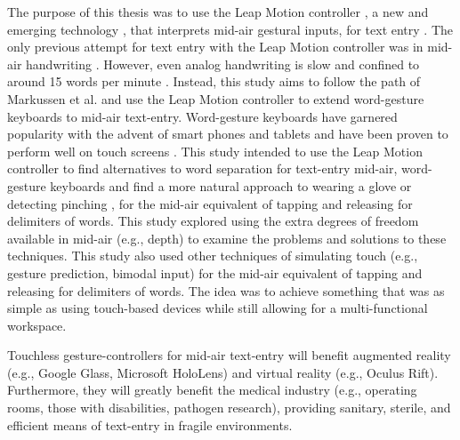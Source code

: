 The purpose of this thesis was to use the Leap Motion controller \cite{ref_leap_motion}, a new and emerging technology \cite{ref_leap_painting,ref_leap_device_evaluation_1,ref_leap_device_evaluation_2}, that interprets mid-air gestural inputs, for text entry \cite{ref_leap_tech}. The only previous attempt for text entry with the Leap Motion controller was in mid-air handwriting \cite{ref_air_handwriting}. However, even analog handwriting is slow and confined to around 15 words per minute \cite{ref_handprinting_alternatives}. Instead, this study aims to follow the path of Markussen et al. \cite{ref_vulture} and use the Leap Motion controller to extend word-gesture keyboards to mid-air text-entry. Word-gesture keyboards have garnered popularity with the advent of smart phones and tablets and have been proven to perform well on touch screens \cite{ref_shape_writing,ref_the_word_gesture_keyboard,ref_shapewriter_iphone}. This study intended to use the Leap Motion controller to find alternatives to word separation for text-entry mid-air, word-gesture keyboards and find a more natural approach to wearing a glove or detecting pinching \cite{ref_vulture,ref_airstroke}, for the mid-air equivalent of tapping and releasing for delimiters of words. This study explored using the extra degrees of freedom available in mid-air (e.g., depth) to examine the problems and solutions to these techniques. This study also used other techniques of simulating touch (e.g., gesture prediction, bimodal input) for the mid-air equivalent of tapping and releasing for delimiters of words. The idea was to achieve something that was as simple as using touch-based devices while still allowing for a multi-functional workspace.

Touchless gesture-controllers for mid-air text-entry will benefit augmented reality (e.g., Google Glass, Microsoft HoloLens) and virtual reality (e.g., Oculus Rift). Furthermore, they will greatly benefit the medical industry (e.g., operating rooms, those with disabilities, pathogen research), providing sanitary, sterile, and efficient means of text-entry in fragile environments.

